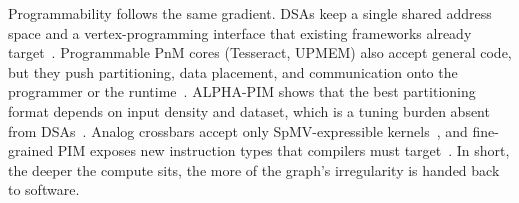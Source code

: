\documentclass[journal,onecolumn]{IEEEtran}
\begin{document}
Programmability follows the same gradient. DSAs keep a single shared address space and a vertex-programming interface that existing frameworks already target~\cite{ham2016graphicionado}. Programmable PnM cores (Tesseract, UPMEM) also accept general code, but they push partitioning, data placement, and communication onto the programmer or the runtime~\cite{ahn2015tesseract,cai2024pimpam,barkhordar2025alphapim}. ALPHA-PIM shows that the best partitioning format depends on input density and dataset, which is a tuning burden absent from DSAs~\cite{barkhordar2025alphapim}. Analog crossbars accept only SpMV-expressible kernels~\cite{song2018graphr}, and fine-grained PIM exposes new instruction types that compilers must target~\cite{yenimol2026cograf}. In short, the deeper the compute sits, the more of the graph's irregularity is handed back to software.
\end{document}
